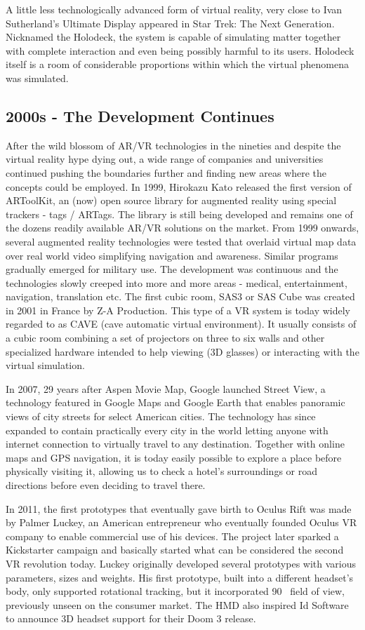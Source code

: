 \documentclass[12pt, a4paper]{article}
\begin{document}
A little less technologically advanced form of virtual reality, very close to Ivan Sutherland’s Ultimate Display appeared in Star Trek: The Next Generation. Nicknamed the Holodeck, the system is capable of simulating matter together with complete interaction and even being possibly harmful to its users. Holodeck itself is a room of considerable proportions within which the virtual phenomena was simulated.

\subsection{2000s - The Development Continues}
After the wild blossom of AR/VR technologies in the nineties and despite the virtual reality hype dying out, a wide range of companies and universities continued pushing the boundaries further and finding new areas where the concepts could be employed. In 1999, Hirokazu Kato released the first version of ARToolKit, an (now) open source library for augmented reality using special trackers - tags / ARTags. The library is still being developed and  remains one of the dozens readily available AR/VR solutions on the market. From 1999 onwards, several augmented reality technologies were tested that overlaid virtual map data over real world video simplifying navigation and awareness. Similar programs gradually emerged for military use. The development was continuous and the technologies slowly creeped into more and more areas - medical, entertainment, navigation, translation etc. The first cubic room, SAS3 or SAS Cube was created in 2001 in France by Z-A Production. This type of a VR system is today widely regarded to as CAVE (cave automatic virtual environment). It usually consists of a cubic room combining a set of projectors on three to six walls and other specialized hardware intended to help viewing (3D glasses) or interacting with the virtual simulation.

In 2007, 29 years after Aspen Movie Map, Google launched Street View, a technology featured in Google Maps and Google Earth that enables panoramic views of city streets for select American cities. The technology has since expanded to contain practically every city in the world letting anyone with internet connection to virtually travel to any destination. Together with online maps and GPS navigation, it is today easily possible to explore a place before physically visiting it, allowing us to check a hotel’s surroundings or road directions before even deciding to travel there.

In 2011, the first prototypes that eventually gave birth to Oculus Rift was made by Palmer Luckey, an American entrepreneur who eventually founded Oculus VR company to enable commercial use of his devices. The project later sparked a Kickstarter campaign and basically started what can be considered the second VR revolution today. Luckey originally developed several prototypes with various parameters, sizes and weights. His first prototype, built into a different headset’s body, only supported rotational tracking, but it incorporated 90\degree~ field of view, previously unseen on the consumer market. The HMD also inspired Id Software to announce 3D headset support for their Doom 3 release.
\end{document}

